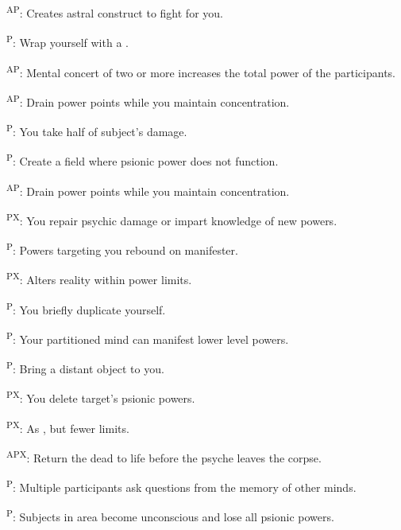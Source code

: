 \begin{enumerate*}
      \textsuperscript{AP}: Creates astral construct to fight for you. %

      \textsuperscript{P}: Wrap yourself with a .

      \textsuperscript{AP}: Mental concert of two or more increases the total power of the participants. %

      \textsuperscript{AP}: Drain power points while you maintain concentration. %

      \textsuperscript{P}: You take half of subject's damage.

\item {}\textsuperscript{P}: Create a field where psionic power does not function. %

\item {}\textsuperscript{AP}: Drain power points while you maintain concentration.

      \textsuperscript{PX}: You repair psychic damage or impart knowledge of new powers. %

      \textsuperscript{P}: Powers targeting you rebound on manifester. %

\item {}\textsuperscript{PX}: Alters reality within power limits. %

      \textsuperscript{P}: You briefly duplicate yourself. %

      \textsuperscript{P}: Your partitioned mind can manifest lower level powers. %

      \textsuperscript{P}: Bring a distant object to you.

\item {}\textsuperscript{PX}: You delete target's psionic powers. %


      \textsuperscript{PX}: As , but fewer limits. %

      \textsuperscript{APX}: Return the dead to life before the psyche leaves the corpse.

      \textsuperscript{P}: Multiple participants ask questions from the memory of other minds.

      \textsuperscript{P}: Subjects in area become unconscious and lose all psionic powers.
\end{enumerate*}


